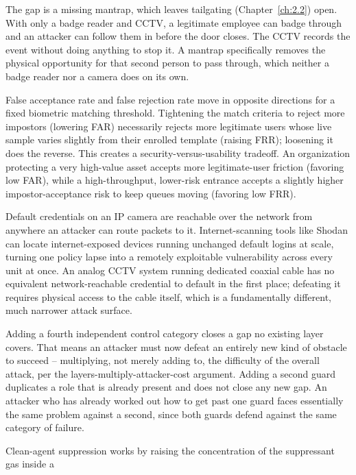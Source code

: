 \begin{answerkey}
\item The gap is a missing mantrap, which leaves tailgating (Chapter~\ref{ch:2.2}) open. With only
a badge reader and CCTV, a legitimate employee can badge through and an attacker can follow them in
before the door closes. The CCTV records the event without doing anything to stop it. A mantrap
specifically removes the physical opportunity for that second person to pass through, which neither
a badge reader nor a camera does on its own.
\item False acceptance rate and false rejection rate move in opposite directions for a fixed
biometric matching threshold. Tightening the match criteria to reject more impostors (lowering FAR)
necessarily rejects more legitimate users whose live sample varies slightly from their enrolled
template (raising FRR); loosening it does the reverse. This creates a security-versus-usability
tradeoff. An organization protecting a very high-value asset accepts more legitimate-user friction
(favoring low FAR), while a high-throughput, lower-risk entrance accepts a slightly higher
impostor-acceptance risk to keep queues moving (favoring low FRR).
\item Default credentials on an IP camera are reachable over the network from anywhere an attacker
can route packets to it. Internet-scanning tools like Shodan can locate internet-exposed devices
running unchanged default logins at scale, turning one policy lapse into a remotely exploitable
vulnerability across every unit at once. An analog CCTV system running dedicated coaxial cable has
no equivalent network-reachable credential to default in the first place; defeating it requires
physical access to the cable itself, which is a fundamentally different, much narrower attack
surface.
\item Adding a fourth independent control category closes a gap no existing layer covers. That
means an attacker must now defeat an entirely new kind of obstacle to succeed -- multiplying, not
merely adding to, the difficulty of the overall attack, per the layers-multiply-attacker-cost
argument. Adding a second guard duplicates a role that is already present and does not close any
new gap. An attacker who has already worked out how to get past one guard faces essentially the
same problem against a second, since both guards defend against the same category of failure.
\item Clean-agent suppression works by raising the concentration of the suppressant gas inside a

\end{answerkey}
